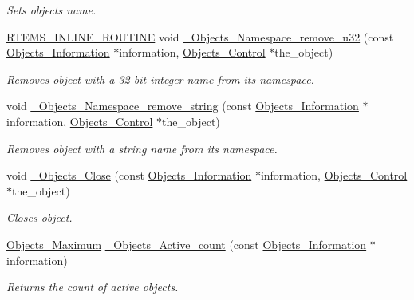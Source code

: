 \begin{DoxyCompactItemize}
\begin{DoxyCompactList}\small\item\em Sets objects name. \end{DoxyCompactList}\item 
\mbox{\hyperlink{group__RTEMSScoreBaseDefs_gac216239df231d5dbd15e3520b0b9313f}{R\+T\+E\+M\+S\+\_\+\+I\+N\+L\+I\+N\+E\+\_\+\+R\+O\+U\+T\+I\+NE}} void \mbox{\hyperlink{group__RTEMSScoreObject_gab8d9bdacd7890b74bd890eda839c0f86}{\+\_\+\+Objects\+\_\+\+Namespace\+\_\+remove\+\_\+u32}} (const \mbox{\hyperlink{structObjects__Information}{Objects\+\_\+\+Information}} $\ast$information, \mbox{\hyperlink{structObjects__Control}{Objects\+\_\+\+Control}} $\ast$the\+\_\+object)
\begin{DoxyCompactList}\small\item\em Removes object with a 32-\/bit integer name from its namespace. \end{DoxyCompactList}\item 
void \mbox{\hyperlink{group__RTEMSScoreObject_ga9bcaf0821a56159d15dbb69f97587aba}{\+\_\+\+Objects\+\_\+\+Namespace\+\_\+remove\+\_\+string}} (const \mbox{\hyperlink{structObjects__Information}{Objects\+\_\+\+Information}} $\ast$information, \mbox{\hyperlink{structObjects__Control}{Objects\+\_\+\+Control}} $\ast$the\+\_\+object)
\begin{DoxyCompactList}\small\item\em Removes object with a string name from its namespace. \end{DoxyCompactList}\item 
void \mbox{\hyperlink{group__RTEMSScoreObject_ga48be735854a391514fdac4881e9ef8fc}{\+\_\+\+Objects\+\_\+\+Close}} (const \mbox{\hyperlink{structObjects__Information}{Objects\+\_\+\+Information}} $\ast$information, \mbox{\hyperlink{structObjects__Control}{Objects\+\_\+\+Control}} $\ast$the\+\_\+object)
\begin{DoxyCompactList}\small\item\em Closes object. \end{DoxyCompactList}\item 
\mbox{\hyperlink{group__RTEMSScoreObject_gaa2735357885ec7d7157c32f3f835f9ae}{Objects\+\_\+\+Maximum}} \mbox{\hyperlink{group__RTEMSScoreObject_ga4459fd7150f400e3217170758d0426a3}{\+\_\+\+Objects\+\_\+\+Active\+\_\+count}} (const \mbox{\hyperlink{structObjects__Information}{Objects\+\_\+\+Information}} $\ast$information)
\begin{DoxyCompactList}\small\item\em Returns the count of active objects. \end{DoxyCompactList}\item 

\end{DoxyCompactItemize}
